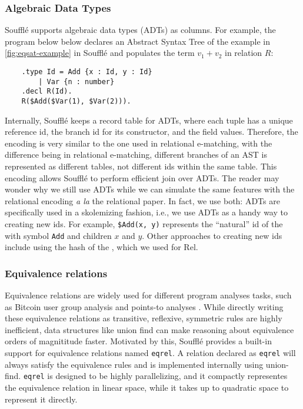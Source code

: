\subsubsection*{Algebraic Data Types}
Souffl\'e supports algebraic data types (ADTs) as columns.
For example, the program below below declares 
 an Abstract Syntax Tree of the example in \autoref{fig:eqsat-example}
 in Souffl\'e
 and populates the term $v_1+v_2$ in relation $R$:
\begin{verbatim}
    .type Id = Add {x : Id, y : Id}
        | Var {n : number}
    .decl R(Id).
    R($Add($Var(1), $Var(2))).
\end{verbatim}

Internally, Souffl\'e keeps a record table for ADTs, 
 where each tuple has a unique reference id, 
 the branch id for its constructor, and
 the field values.
Therefore, 
 the encoding is very similar to the one used 
 in relational e-matching, with the difference being
 in relational e-matching, different branches of an AST
 is represented as different tables, 
 not different ids within the same table.
This encoding allows Souffl\'e to 
 perform efficient join over ADTs.
The reader may wonder 
 why we still use ADTs while we can 
 simulate the same features with 
 the relational encoding 
 \textit{a la} the relational \ematching paper.
In fact,
 we use both:
 ADTs are specifically used in a skolemizing fashion,
 i.e., we use ADTs as a handy way to creating new \eclass ids.
For example, \verb|$Add(x, y)| represents the ``natural'' \eclass id
 of the \enode with symbol \verb|Add| and children $x$ and $y$.
Other approaches to creating new \eclass ids include 
 using the hash of the \enodes, which we used for Rel.

\def\eqrel{\texttt{eqrel}}

\subsubsection*{Equivalence relations}
Equivalence relations are widely used 
 for different program analyses tasks, 
 such as Bitcoin user group analysis \citep{anonymity-bitcoin} 
 and points-to analyses \citep{multi-alaias-analysis,points-to-linear}.
While directly writing these equivalence relations as
 transitive, reflexive, symmetric rules are highly inefficient,
 data structures like union find \citep{unionfind} can 
 make reasoning about equivalence orders of magnititude faster.
Motivated by this, Souffl\'e provides a built-in support for 
 equivalence relations named \eqrel. 
A relation declared as \eqrel{} will
 always satisfy the equivalence rules 
 and is implemented internally using union-find.
\eqrel{} is designed to be highly parallelizing, 
 and it compactly representes the equivalence relation
 in linear space, while it takes up to quadratic space
 to represent it directly.

